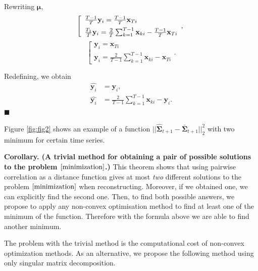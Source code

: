 \documentclass[12pt]{article}
\begin{document}
Rewriting $\boldsymbol{\mu}$,
$$
	\left[
	\begin{array}{ll}
		\frac{T-1}{T}\mathbf{y}_i = \frac{T-1}{T}\mathbf{x}_{Ti}
		\\[1ex]
		\frac{T_1}{T}\mathbf{y}_i = \frac{2}{T} \sum_{k=1}^{T-1} \mathbf{x}_{ki} - \frac{T-1}{T}\mathbf{x}_{Ti}
	\end{array},
	\right .\\[1ex]
$$
$$
	\left[
	\begin{array}{ll}
		\mathbf{y}_i = \mathbf{x}_{Ti}
		\\[1ex]
		\mathbf{y}_i = \frac{2}{T-1} \sum_{k=1}^{T-1} \mathbf{x}_{ki} - \mathbf{x}_{Ti}
	\end{array}.
	\right .
$$

Redefining, we obtain
\begin{align*}
	\hat{\mathbf{y}_i} &= \mathbf{y}_i,\\
	\hat{\mathbf{y}_i} &= \frac{2}{T-1} \sum_{k=1}^{T-1} \mathbf{x}_{ki} - \mathbf{y}_i.
\end{align*}
\hfill$\blacksquare$

Figure \ref{fig:fig2} shows an example of a function $||\hat{\mathbf{\Sigma}}_{t+1} - \bar{\mathbf{\Sigma}}_{t+1}||_2^2$ with two minimum for certain time series.

\textbf{Corollary. (A trivial method for obtaining a pair of possible solutions to the problem $\eqref{minimization}$.)} This theorem shows that using pairwise correlation as a distance function gives at most \emph{two} different solutions to the problem $\eqref{minimization}$ when reconstructing. Moreover, if we obtained one, we can explicitly find the second one. Then, to find both possible answers, we propose to apply any non-convex optimisation method to find at least one of the minimum of the function. Therefore with the formula above we are able to find another minimum.

The problem with the trivial method is the computational cost of non-convex optimization methods. As an alternative, we propose the following method using only singular matrix decomposition.
\end{document}
